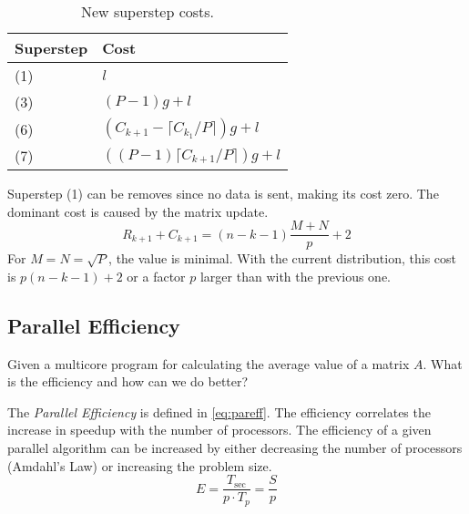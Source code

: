 \documentclass[../main.tex]{subfiles}
\begin{document}
\begin{solution}
\begin{enumerate}
\begin{table}[H]
\begin{tabular}{ll}
		\toprule
		Superstep & Cost  \\
		\midrule
		(1) & $l$ \\
		(3) & $(P-1)g+l$ \\
		(6) & $(C_{k+1} - \lceil C_{k_1}/P  \rceil )g + l$ \\
		(7) & $((P-1) \lceil C_{k+1}/P \rceil )g + l$\\
		\bottomrule
	\end{tabular}
	\caption{New superstep costs.}
	\label{tbl:lucost}
	\end{table}
	Superstep (1) can be removes since no data is sent, making its cost zero. The dominant cost is caused by the matrix update.
	\begin{equation}
		R_{k+1} + C_{k+1} = (n-k-1) \frac{M+N}{p} + 2
	\end{equation}
	For $M = N = \sqrt{P}$, the value is minimal. With the current distribution, this cost is $p (n-k-1) + 2$ or a factor $p$ larger than with the previous one.
\end{enumerate}
\end{solution}

\subsection{Parallel Efficiency}
\begin{question}
Given a multicore program for calculating the average value of a matrix $A$. What is the efficiency and how can we do
better?
\end{question}
\begin{solution} The \emph{Parallel Efficiency} is defined in \autoref{eq:pareff}. The efficiency correlates the
increase in speedup with the number of processors. The efficiency of a given parallel algorithm can be increased by
either decreasing the number of processors (Amdahl's Law) or increasing the problem size.
\begin{equation}\label{eq:pareff}
	E = \frac{T_\text{sec}}{p \cdot T_p} = \frac{S}{p}
\end{equation}
\end{solution}
\end{document}
